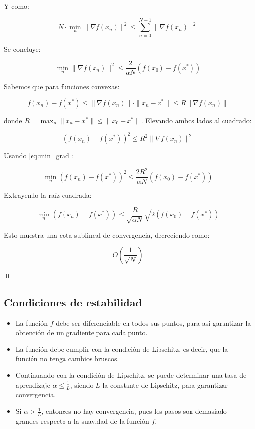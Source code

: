 \documentclass[conference]{IEEEtran}
\begin{document}
Y como:

\begin{equation}
N \cdot \min_n \|\nabla f(x_n)\|^2 \leq \sum_{n=0}^{N-1} \|\nabla f(x_n)\|^2
\end{equation}

Se concluye:

\begin{equation}
\min_n \|\nabla f(x_n)\|^2 \leq \frac{2}{\alpha N}(f(x_0) - f(x^*)) \label{eq:min_grad}
\end{equation}

Sabemos que para funciones convexas:

\begin{equation}
f(x_n) - f(x^*) \leq \|\nabla f(x_n)\|\cdot \|x_n - x^*\| \leq R \|\nabla f(x_n)\|
\end{equation}

donde $R = \max_n \|x_n - x^*\| \leq \|x_0 - x^*\|$. Elevando ambos lados al cuadrado:

\begin{equation}
(f(x_n) - f(x^*))^2 \leq R^2 \|\nabla f(x_n)\|^2
\end{equation}

Usando \eqref{eq:min_grad}:

\begin{equation}
\min_n (f(x_n) - f(x^*))^2 \leq \frac{2R^2}{\alpha N}(f(x_0) - f(x^*))
\end{equation}

Extrayendo la raíz cuadrada:

\begin{equation}
\min_n (f(x_n) - f(x^*)) \leq \frac{R}{\sqrt{\alpha N}} \sqrt{2(f(x_0) - f(x^*))}
\end{equation}

Esto muestra una cota sublineal de convergencia, decreciendo como:

\begin{equation}
\boxed{O\left( \frac{1}{\sqrt{N}} \right)}
\end{equation}

\qed
\subsection{Condiciones de estabilidad}\label{sec1:4}
\begin{itemize}
    \item La función $f$ debe ser diferenciable en todos sus puntos, para así garantizar la obtención de un gradiente para cada punto.
    \item La función debe cumplir con la condición de Lipschitz, es decir, que la función no tenga cambios bruscos.
    \item Continuando con la condición de Lipschitz, se puede determinar una tasa de aprendizaje $\alpha \leq \frac{1}{L}$, siendo $L$ la constante de Lipschitz, para garantizar convergencia.
    \item Si $\alpha > \frac{1}{L}$, entonces no hay convergencia, pues los pasos son demasiado grandes respecto a la suavidad de la función $f$.
\end{itemize}
\end{document}
